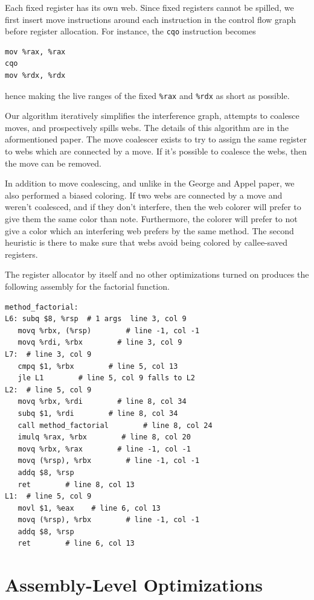 \documentclass[11pt]{article}
\begin{document}
Each fixed register has its own web.  Since fixed registers cannot be
spilled, we first insert move instructions around each instruction in
the control flow graph before register allocation.  For instance, the
\texttt{cqo} instruction becomes
\begin{verbatim}
mov %rax, %rax
cqo
mov %rdx, %rdx
\end{verbatim}
hence making the live ranges of the fixed \texttt{\%rax} and
\texttt{\%rdx} as short as possible.

Our algorithm iteratively simplifies the interference graph, attempts
to coalesce moves, and prospectively spills webs.  The details of this
algorithm are in the aformentioned paper.  The move coalescer exists
to try to assign the same register to webs which are connected by a
move.  If it's possible to coalesce the webs, then the move can be
removed.

In addition to move coalescing, and unlike in the George and Appel
paper, we also performed a biased coloring.  If two webs are connected
by a move and weren't coalesced, and if they don't interfere, then the
web colorer will prefer to give them the same color than note.
Furthermore, the colorer will prefer to not give a color which an
interfering web prefers by the same method.  The second heuristic is
there to make sure that webs avoid being colored by callee-saved
registers.

The register allocator by itself and no other optimizations turned on
produces the following assembly for the factorial function.

{\footnotesize
\begin{verbatim}
method_factorial:
L6: subq $8, %rsp  # 1 args  line 3, col 9
   movq %rbx, (%rsp)        # line -1, col -1
   movq %rdi, %rbx        # line 3, col 9
L7:  # line 3, col 9
   cmpq $1, %rbx        # line 5, col 13
   jle L1        # line 5, col 9 falls to L2
L2:  # line 5, col 9
   movq %rbx, %rdi        # line 8, col 34
   subq $1, %rdi        # line 8, col 34
   call method_factorial        # line 8, col 24
   imulq %rax, %rbx        # line 8, col 20
   movq %rbx, %rax        # line -1, col -1
   movq (%rsp), %rbx        # line -1, col -1
   addq $8, %rsp
   ret        # line 8, col 13
L1:  # line 5, col 9
   movl $1, %eax    # line 6, col 13
   movq (%rsp), %rbx        # line -1, col -1
   addq $8, %rsp
   ret        # line 6, col 13
\end{verbatim}}

\section{Assembly-Level Optimizations}
\end{document}
